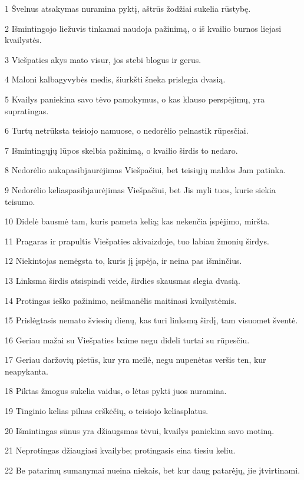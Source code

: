 \par 1 Švelnus atsakymas nuramina pyktį, aštrūs žodžiai sukelia rūstybę. 
\par 2 Išmintingojo liežuvis tinkamai naudoja pažinimą, o iš kvailio burnos liejasi kvailystės. 
\par 3 Viešpaties akys mato visur, jos stebi blogus ir gerus. 
\par 4 Maloni kalba­gyvybės medis, šiurkšti šneka prislegia dvasią. 
\par 5 Kvailys paniekina savo tėvo pamokymus, o kas klauso perspėjimų, yra supratingas. 
\par 6 Turtų netrūksta teisiojo namuose, o nedorėlio pelnas­tik rūpesčiai. 
\par 7 Išmintingųjų lūpos skelbia pažinimą, o kvailio širdis to nedaro. 
\par 8 Nedorėlio auka­pasibjaurėjimas Viešpačiui, bet teisiųjų maldos Jam patinka. 
\par 9 Nedorėlio kelias­pasibjaurėjimas Viešpačiui, bet Jis myli tuos, kurie siekia teisumo. 
\par 10 Didelė bausmė tam, kuris pameta kelią; kas nekenčia įspėjimo, miršta. 
\par 11 Pragaras ir prapultis Viešpaties akivaizdoje, tuo labiau žmonių širdys. 
\par 12 Niekintojas nemėgsta to, kuris jį įspėja, ir neina pas išminčius. 
\par 13 Linksma širdis atsispindi veide, širdies skausmas slegia dvasią. 
\par 14 Protingas ieško pažinimo, neišmanėlis maitinasi kvailystėmis. 
\par 15 Prislėgtasis nemato šviesių dienų, kas turi linksmą širdį, tam visuomet šventė. 
\par 16 Geriau mažai su Viešpaties baime negu dideli turtai su rūpesčiu. 
\par 17 Geriau daržovių pietūs, kur yra meilė, negu nupenėtas veršis ten, kur neapykanta. 
\par 18 Piktas žmogus sukelia vaidus, o lėtas pykti juos nuramina. 
\par 19 Tinginio kelias pilnas erškėčių, o teisiojo kelias­platus. 
\par 20 Išmintingas sūnus yra džiaugsmas tėvui, kvailys paniekina savo motiną. 
\par 21 Neprotingas džiaugiasi kvailybe; protingasis eina tiesiu keliu. 
\par 22 Be patarimų sumanymai nueina niekais, bet kur daug patarėjų, jie įtvirtinami. 
